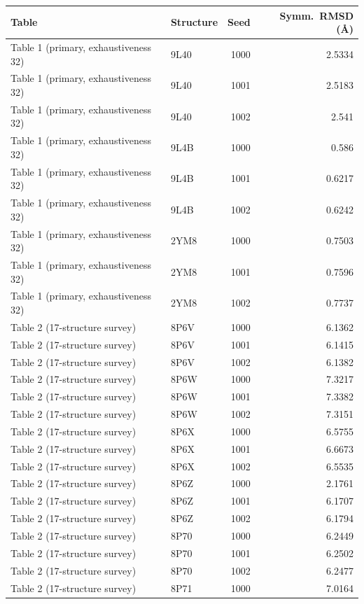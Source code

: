 \begin{longtable}{llrr}
\toprule
Table & Structure & Seed & Symm.\ RMSD (\AA) \\
\midrule
\endhead
Table 1 (primary, exhaustiveness 32) & 9L40 & 1000 & 2.5334 \\
Table 1 (primary, exhaustiveness 32) & 9L40 & 1001 & 2.5183 \\
Table 1 (primary, exhaustiveness 32) & 9L40 & 1002 & 2.541 \\
Table 1 (primary, exhaustiveness 32) & 9L4B & 1000 & 0.586 \\
Table 1 (primary, exhaustiveness 32) & 9L4B & 1001 & 0.6217 \\
Table 1 (primary, exhaustiveness 32) & 9L4B & 1002 & 0.6242 \\
Table 1 (primary, exhaustiveness 32) & 2YM8 & 1000 & 0.7503 \\
Table 1 (primary, exhaustiveness 32) & 2YM8 & 1001 & 0.7596 \\
Table 1 (primary, exhaustiveness 32) & 2YM8 & 1002 & 0.7737 \\
Table 2 (17-structure survey) & 8P6V & 1000 & 6.1362 \\
Table 2 (17-structure survey) & 8P6V & 1001 & 6.1415 \\
Table 2 (17-structure survey) & 8P6V & 1002 & 6.1382 \\
Table 2 (17-structure survey) & 8P6W & 1000 & 7.3217 \\
Table 2 (17-structure survey) & 8P6W & 1001 & 7.3382 \\
Table 2 (17-structure survey) & 8P6W & 1002 & 7.3151 \\
Table 2 (17-structure survey) & 8P6X & 1000 & 6.5755 \\
Table 2 (17-structure survey) & 8P6X & 1001 & 6.6673 \\
Table 2 (17-structure survey) & 8P6X & 1002 & 6.5535 \\
Table 2 (17-structure survey) & 8P6Z & 1000 & 2.1761 \\
Table 2 (17-structure survey) & 8P6Z & 1001 & 6.1707 \\
Table 2 (17-structure survey) & 8P6Z & 1002 & 6.1794 \\
Table 2 (17-structure survey) & 8P70 & 1000 & 6.2449 \\
Table 2 (17-structure survey) & 8P70 & 1001 & 6.2502 \\
Table 2 (17-structure survey) & 8P70 & 1002 & 6.2477 \\
Table 2 (17-structure survey) & 8P71 & 1000 & 7.0164 \\

\end{longtable}
